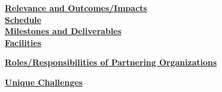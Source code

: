 





\vspace*{.05in}\noindent \underline{\textbf{Relevance and Outcomes/Impacts}} \\[-2ex]




\vspace*{.05in}\noindent \underline{\textbf{Schedule}} \\[-2ex]
 

\vspace*{.05in}\noindent \underline{\textbf{Milestones and Deliverables}} \\[-2ex]
 

\vspace*{.05in}\noindent \underline{\textbf{Facilities}}



\vspace*{.05in}\noindent \underline{\textbf{Roles/Responsibilities of 
Partnering Organizations}}




\vspace*{.05in}\noindent \underline{\textbf{Unique Challenges}}




